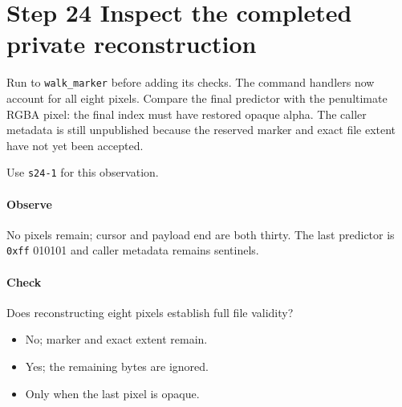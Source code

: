 \section{Step 24 Inspect the completed private reconstruction}\label{qoi-s24}
Run to \texttt{walk\_marker} before adding its checks. The command handlers now account for all eight pixels. Compare the final predictor with the penultimate RGBA pixel: the final index must have restored opaque alpha. The caller metadata is still unpublished because the reserved marker and exact file extent have not yet been accepted.

Use \texttt{s24-1} for this observation.

\paragraph{Observe} No pixels remain; cursor and payload end are both thirty. The last predictor is \texttt{0xff} 010101 and caller metadata remains sentinels.

\paragraph{Check} Does reconstructing eight pixels establish full file validity?
\begin{itemize}
  \item[A.] No; marker and exact extent remain.
  \item[B.] Yes; the remaining bytes are ignored.
  \item[C.] Only when the last pixel is opaque.
\end{itemize}
